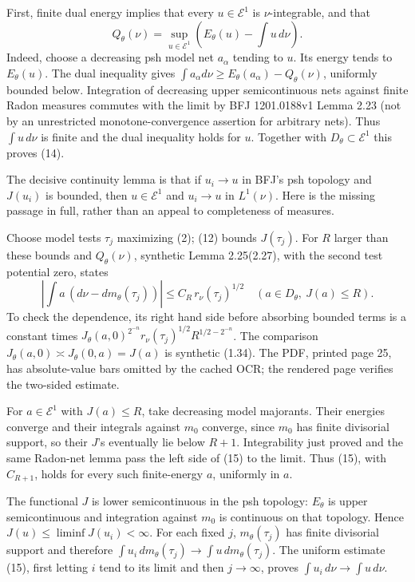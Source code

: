 \documentclass[11pt]{article}
\begin{document}
First, finite dual energy implies that every \(u\in\mathcal E^1\) is \(\nu\)-integrable, and that
\[
 Q_\theta(\nu)=\sup_{u\in\mathcal E^1}
 \left(E_\theta(u)-\int u\,d\nu\right).
 \tag{14}
\]
Indeed, choose a decreasing psh model net \(a_\alpha\) tending to \(u\). Its energy tends to \(E_\theta(u)\). The dual inequality gives \(\int a_\alpha d\nu\geq E_\theta(a_\alpha)-Q_\theta(\nu)\), uniformly bounded below. Integration of decreasing upper semicontinuous nets against finite Radon measures commutes with the limit by BFJ 1201.0188v1 Lemma 2.23 (not by an unrestricted monotone-convergence assertion for arbitrary nets). Thus \(\int u\,d\nu\) is finite and the dual inequality holds for \(u\). Together with \(D_\theta\subset\mathcal E^1\) this proves (14).

The decisive continuity lemma is that if \(u_i\to u\) in BFJ's psh topology and \(J(u_i)\) is bounded, then \(u\in\mathcal E^1\) and \(u_i\to u\) in \(L^1(\nu)\). Here is the missing passage in full, rather than an appeal to completeness of measures.

Choose model tests \(\tau_j\) maximizing (2); (12) bounds \(J(\tau_j)\). For \(R\) larger than these bounds and \(Q_\theta(\nu)\), synthetic Lemma 2.25(2.27), with the second test potential zero, states
\[
 \left|\int a\,(d\nu-dm_\theta(\tau_j))\right|
 \leq C_R\,r_\nu(\tau_j)^{1/2}
 \quad(a\in D_\theta,\ J(a)\leq R).
 \tag{15}
\]
To check the dependence, its right hand side before absorbing bounded terms is a constant times \(J_\theta(a,0)^{2^{-n}}r_\nu(\tau_j)^{1/2}R^{1/2-2^{-n}}\). The comparison \(J_\theta(a,0)\asymp J_\theta(0,a)=J(a)\) is synthetic (1.34). The PDF, printed page 25, has absolute-value bars omitted by the cached OCR; the rendered page verifies the two-sided estimate.

For \(a\in\mathcal E^1\) with \(J(a)\leq R\), take decreasing model majorants. Their energies converge and their integrals against \(m_0\) converge, since \(m_0\) has finite divisorial support, so their \(J\)'s eventually lie below \(R+1\). Integrability just proved and the same Radon-net lemma pass the left side of (15) to the limit. Thus (15), with \(C_{R+1}\), holds for every such finite-energy \(a\), uniformly in \(a\).

The functional \(J\) is lower semicontinuous in the psh topology: \(E_\theta\) is upper semicontinuous and integration against \(m_0\) is continuous on that topology. Hence \(J(u)\leq\liminf J(u_i)<\infty\). For each fixed \(j\), \(m_\theta(\tau_j)\) has finite divisorial support and therefore \(\int u_i\,dm_\theta(\tau_j)\to\int u\,dm_\theta(\tau_j)\). The uniform estimate (15), first letting \(i\) tend to its limit and then \(j\to\infty\), proves \(\int u_i\,d\nu\to\int u\,d\nu\).
\end{document}
